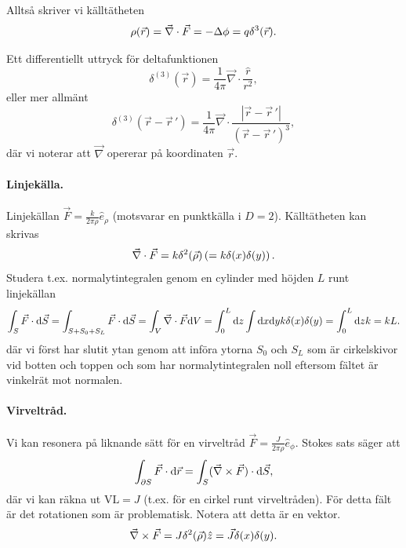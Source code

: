 \documentclass[%
oneside,                 %
final,                   %
10pt]{article}
\begin{document}
\noindent
Alltså skriver vi källtätheten 
$$
\rho(\vec{r}) = \vec{\nabla} \cdot \vec{F} = -\Delta \phi = q \delta^3(\vec{r}).
$$

Ett differentiellt uttryck för deltafunktionen
\[
\delta^{(3)} \left( \vec{r} \right) 
= \frac{1}{4\pi} \vec{\nabla} \cdot \frac{\hat{r}}{r^2},
\]
eller mer allmänt
\[
\delta^{(3)} \left( \vec{r} - \vec{r}\,' \right) 
= \frac{1}{4\pi} \vec{\nabla} \cdot 
\frac{ \left| \vec{r} - \vec{r}\,' \right|}{\left( \vec{r} - \vec{r}\,' \right)^3 },
\]
där vi noterar att $\vec{\nabla}$ opererar på koordinaten $\vec{r}$.


\paragraph{Linjekälla.}
Linjekällan $\vec{F} = \frac{k}{2 \pi \rho} \hat{e}_\rho$ (motsvarar en punktkälla i $D=2$).
Källtätheten kan skrivas
$$
\vec{\nabla} \cdot \vec{F} = k \delta^2(\vec{\rho}) \left( = k \delta(x) \delta(y) \right).
$$
Studera t.ex. normalytintegralen genom en cylinder med höjden $L$ runt linjekällan
$$
\int_S \vec{F} \cdot \mbox{d}\vec{S} = \int_{S+S_0+S_L} \vec{F} \cdot \mbox{d}\vec{S} = \int_V \vec{\nabla} \cdot \vec{F} \mbox{d} V = \int_0^L \mbox{d} z \int \mbox{d}x \mbox{d}y k \delta(x)\delta(y) = \int_0^L \mbox{d} z k = k L.
$$
där vi först har slutit ytan genom att införa ytorna $S_0$ och $S_L$ som är cirkelskivor vid botten och toppen och som har normalytintegralen noll eftersom fältet är vinkelrät mot normalen.

\paragraph{Virveltråd.}
Vi kan resonera på liknande sätt för en virveltråd $\vec{F} = \frac{J}{2 \pi \rho} \hat{e}_\phi$. Stokes sats säger att
$$
\int_{\partial S} \vec{F} \cdot \mbox{d} \vec{r} = \int_S (\vec{\nabla} \times \vec{F}) \cdot \mbox{d} \vec{S},
$$
där vi kan räkna ut $\mathrm{VL} = J$ (t.ex. för en cirkel runt virveltråden). För detta fält är det rotationen som är problematisk. Notera att detta är en vektor.
$$
\vec{\nabla} \times \vec{F} = J \delta^2(\vec{\rho}) \hat{z} = \vec{J} \delta(x)\delta(y).
$$
\end{document}

